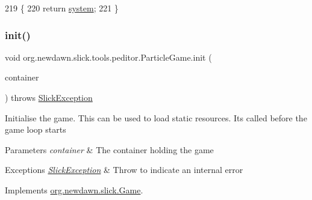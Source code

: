 \begin{DoxyCode}
219                                       \{
220         \textcolor{keywordflow}{return} \mbox{\hyperlink{classorg_1_1newdawn_1_1slick_1_1tools_1_1peditor_1_1_particle_game_a3a6d42e312039ae4f175e6751256f2f7}{system}};
221     \}
\end{DoxyCode}
\mbox{\label{classorg_1_1newdawn_1_1slick_1_1tools_1_1peditor_1_1_particle_game_a61bb3979430161b538b956862686769f}} 
\subsubsection{\texorpdfstring{init()}{init()}}
{\footnotesize\ttfamily void org.\+newdawn.\+slick.\+tools.\+peditor.\+Particle\+Game.\+init (\begin{DoxyParamCaption}\item[{\mbox{\hyperlink{classorg_1_1newdawn_1_1slick_1_1_game_container}{Game\+Container}}}]{container }\end{DoxyParamCaption}) throws \mbox{\hyperlink{classorg_1_1newdawn_1_1slick_1_1_slick_exception}{Slick\+Exception}}\hspace{0.3cm}{\ttfamily [inline]}}

Initialise the game. This can be used to load static resources. It\textquotesingle{}s called before the game loop starts


\begin{DoxyParams}{Parameters}
{\em container} & The container holding the game \\
\hline
\end{DoxyParams}

\begin{DoxyExceptions}{Exceptions}
{\em \mbox{\hyperlink{classorg_1_1newdawn_1_1slick_1_1_slick_exception}{Slick\+Exception}}} & Throw to indicate an internal error \\
\hline
\end{DoxyExceptions}


Implements \mbox{\hyperlink{interfaceorg_1_1newdawn_1_1slick_1_1_game_ad2dd6affab08bb8fdb5fab0815957b7a}{org.\+newdawn.\+slick.\+Game}}.


